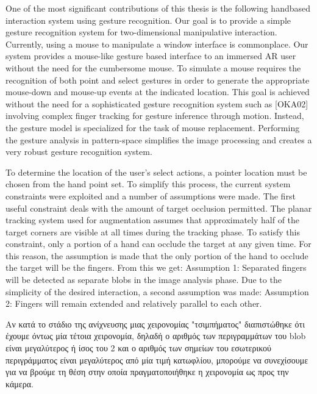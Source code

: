 One of the most significant contributions of this thesis is the following handbased interaction system using gesture recognition. Our goal is to provide a simple gesture recognition system for two-dimensional manipulative interaction. Currently, using a mouse to manipulate a window interface is commonplace. Our system provides a mouse-like gesture based interface to an immersed AR user without the need for the cumbersome mouse. To simulate a mouse requires the recognition of both point and select gestures in order to generate the appropriate mouse-down and mouse-up events at the indicated location. This goal is achieved without the need for a sophisticated gesture recognition system such as [OKA02] involving complex finger tracking for gesture inference through motion. Instead, the gesture model is specialized for the task of mouse replacement. Performing the gesture analysis in pattern-space simplifies the image processing and creates a very robust gesture recognition system.



To determine the location of the user’s select actions, a pointer location must be chosen from the hand point set. To simplify this process, the current system constraints were exploited and a number of assumptions were made. The first useful constraint deals with the amount of target occlusion permitted. The planar tracking system used for augmentation assumes that approximately half of the target corners are visible at all times during the tracking phase. To satisfy this constraint, only a portion of a hand can occlude the target at any given time. For this reason, the assumption is made that the only portion of the hand to occlude the target will be the fingers. From this we get: Assumption 1: Separated fingers will be detected as separate blobs in the image analysis phase. Due to the simplicity of the desired interaction, a second assumption was made: Assumption 2: Fingers will remain extended and relatively parallel to each other.






Αν κατά το στάδιο της ανίχνευσης μιας χειρονομίας "τσιμπήματος" διαπιστώθηκε ότι έχουμε όντως μία τέτοια χειρονομία, δηλαδή ο αριθμός των περιγραμμάτων του blob είναι μεγαλύτερος ή ίσος του 2 και ο αριθμός των σημείων του εσωτερικού περιγράμματος είναι μεγαλύτερος από μία τιμή κατωφλίου, μπορούμε να συνεχίσουμε για να βρούμε τη θέση στην οποία πραγματοποιήθηκε η χειρονομία ως προς την κάμερα.

